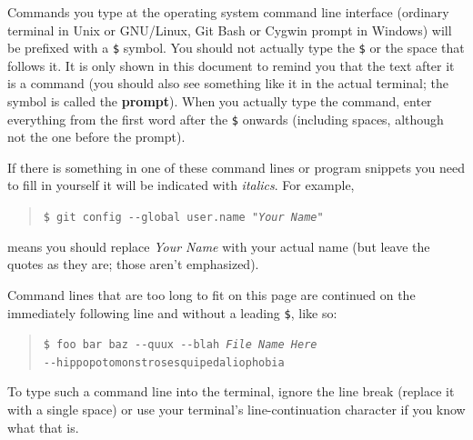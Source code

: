\documentclass[12pt]{article}
\newcommand{\commandline}[1]{\begin{quotation}\texttt{\$ #1}\end{quotation}}
\newcommand{\clloption}[1]{-{}-#1}
\newcommand{\toreplace}[1]{\emph{#1}}
\newcommand{\textdef}[1]{\textbf{#1}}
\begin{document}
Commands you type at the operating system command line interface (ordinary terminal in Unix or GNU/Linux, Git Bash or Cygwin prompt in Windows) will be prefixed with a \texttt{\$} symbol. You should not actually type the \texttt{\$} or the space that follows it. It is only shown in this document to remind you that the text after it is a command (you should also see something like it in the actual terminal; the symbol is called the \textdef{prompt}). When you actually type the command, enter everything from the first word after the \texttt{\$} onwards (including spaces, although not the one before the prompt).

If there is something in one of these command lines or program snippets you need to fill in yourself it will be indicated with \textit{italics}. For example, \commandline{git config \clloption{global} user.name "\toreplace{Your Name}"} means you should replace \toreplace{Your Name} with your actual name (but leave the quotes as they are; those aren't emphasized).

Command lines that are too long to fit on this page are continued on the immediately following line and without a leading \texttt{\$}, like so: \commandline{foo bar baz \clloption{quux} \clloption{blah} \toreplace{File Name Here}\\\clloption{hippopotomonstrosesquipedaliophobia}} To type such a command line into the terminal, ignore the line break (replace it with a single space) or use your terminal's line-continuation character if you know what that is.
\end{document}

